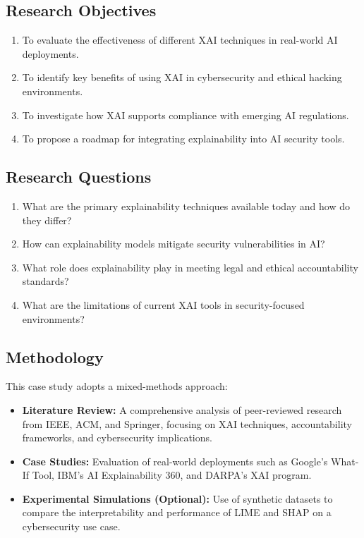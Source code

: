 \documentclass[12pt]{article}
\begin{document}
\subsection{Research Objectives}
\begin{enumerate}[noitemsep]
  \item To evaluate the effectiveness of different XAI techniques in real-world AI deployments.
  \item To identify key benefits of using XAI in cybersecurity and ethical hacking environments.
  \item To investigate how XAI supports compliance with emerging AI regulations.
  \item To propose a roadmap for integrating explainability into AI security tools.
\end{enumerate}

\subsection{Research Questions}
\begin{enumerate}[noitemsep]
  \item What are the primary explainability techniques available today and how do they differ?
  \item How can explainability models mitigate security vulnerabilities in AI?
  \item What role does explainability play in meeting legal and ethical accountability standards?
  \item What are the limitations of current XAI tools in security-focused environments?
\end{enumerate}

\subsection{Methodology}
This case study adopts a mixed-methods approach:
\begin{itemize}[noitemsep]
  \item \textbf{Literature Review:} A comprehensive analysis of peer-reviewed research from IEEE, ACM, and Springer, focusing on XAI techniques, accountability frameworks, and cybersecurity implications.
  \item \textbf{Case Studies:} Evaluation of real-world deployments such as Google’s What-If Tool, IBM’s AI Explainability 360, and DARPA’s XAI program.
  \item \textbf{Experimental Simulations (Optional):} Use of synthetic datasets to compare the interpretability and performance of LIME and SHAP on a cybersecurity use case.
\end{itemize}
\end{document}
